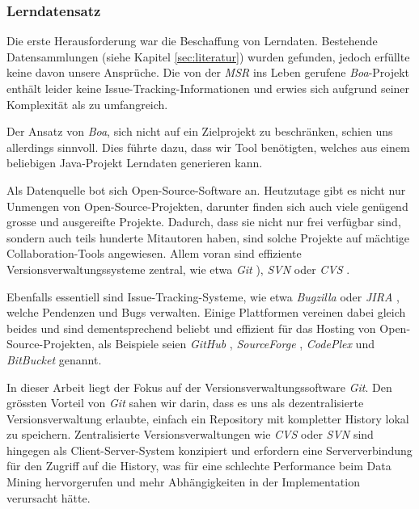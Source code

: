 \documentclass[10pt, a4paper]{article}
\begin{document}

\subsubsection{Lerndatensatz}

Die erste Herausforderung war die Beschaffung von Lerndaten. Bestehende Datensammlungen (siehe Kapitel \ref{sec:literatur}) wurden gefunden, jedoch erfüllte keine davon unsere Ansprüche. Die von der \emph{\ac{MSR}} ins Leben gerufene \emph{Boa}-Projekt enthält leider keine Issue-Tracking-Informationen und erwies sich aufgrund seiner Komplexität als zu umfangreich. 

Der Ansatz von \emph{Boa}, sich nicht auf ein Zielprojekt zu beschränken, schien uns allerdings sinnvoll. Dies führte dazu, dass wir Tool benötigten, welches aus einem beliebigen Java-Projekt Lerndaten generieren kann.

Als Datenquelle bot sich Open-Source-Software an. Heutzutage gibt es nicht nur Unmengen von Open-Source-Projekten, darunter finden sich auch viele genügend grosse und ausgereifte Projekte. Dadurch, dass sie nicht nur frei verfügbar sind, sondern auch teils hunderte Mitautoren haben, sind solche Projekte auf mächtige Collaboration-Tools angewiesen. Allem voran sind effiziente Versionsverwaltungssysteme zentral, wie etwa 
\emph{Git} \cite{githomepage}),
\emph{\ac{SVN}} \cite{svnhomepage} oder 
\emph{\ac{CVS}} \cite{cvshomepage}.

Ebenfalls essentiell sind Issue-Tracking-Systeme, wie etwa 
\emph{Bugzilla} \cite{bugzillahomepage} oder 
\emph{JIRA} \cite{jirahomepage}, 
welche Pendenzen und Bugs verwalten. Einige Plattformen vereinen dabei gleich beides und sind dementsprechend beliebt und effizient für das Hosting von Open-Source-Projekten, als Beispiele seien 
\emph{GitHub} \cite{githubhomepage},
\emph{SourceForge} \cite{sourceforgehomepage}, 
\emph{CodePlex} \cite{codeplexhomepage} und 
\emph{BitBucket} \cite{bitbuckethomepage} genannt.

In dieser Arbeit liegt der Fokus auf der Versionsverwaltungssoftware \emph{Git}. Den grössten Vorteil von \emph{Git} sahen wir darin, dass es uns als dezentralisierte Versionsverwaltung erlaubte, einfach ein Repository mit kompletter History lokal zu speichern. Zentralisierte Versionsverwaltungen wie \emph{\ac{CVS}} oder \emph{\ac{SVN}} sind hingegen als Client-Server-System konzipiert und erfordern eine Serververbindung für den Zugriff auf die History, was für eine schlechte Performance beim Data Mining hervorgerufen und mehr Abhängigkeiten in der Implementation verursacht hätte.
\end{document}
